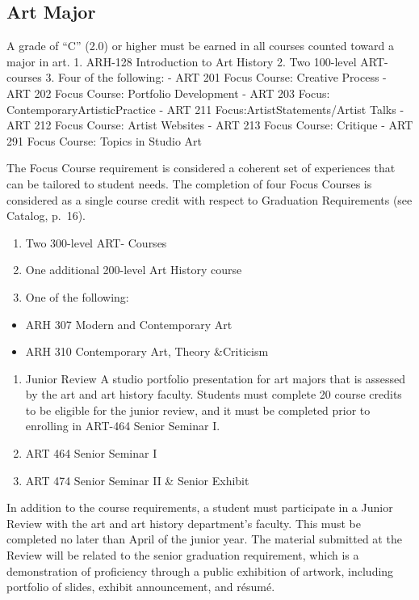 \documentclass[
  letterpaper,
]{scrbook}
\providecommand{\tightlist}{%
  \setlength{\itemsep}{0pt}\setlength{\parskip}{0pt}}
\begin{document}
\hypertarget{art-major}{%
\subsection{Art Major}\label{art-major}}

A grade of ``C'' (2.0) or higher must be earned in all courses counted
toward a major in art. 1. ARH-128 Introduction to Art History 2. Two
100-level ART- courses 3. Four of the following: - ART 201 Focus Course:
Creative Process - ART 202 Focus Course: Portfolio Development - ART 203
Focus: ContemporaryArtisticPractice - ART 211
Focus:ArtistStatements/Artist Talks - ART 212 Focus Course: Artist
Websites - ART 213 Focus Course: Critique - ART 291 Focus Course: Topics
in Studio Art

The Focus Course requirement is considered a coherent set of experiences
that can be tailored to student needs. The completion of four Focus
Courses is considered as a single course credit with respect to
Graduation Requirements (see Catalog, p.~16).

\begin{enumerate}
\def\labelenumi{\arabic{enumi}.}
\setcounter{enumi}{3}
\tightlist
\item
  Two 300-level ART- Courses
\item
  One additional 200-level Art History course
\item
  One of the following:
\end{enumerate}

\begin{itemize}
\tightlist
\item
  ARH 307 Modern and Contemporary Art
\item
  ARH 310 Contemporary Art, Theory \&Criticism
\end{itemize}

\begin{enumerate}
\def\labelenumi{\arabic{enumi}.}
\setcounter{enumi}{6}
\item
  Junior Review A studio portfolio presentation for art majors that is
  assessed by the art and art history faculty. Students must complete 20
  course credits to be eligible for the junior review, and it must be
  completed prior to enrolling in ART-464 Senior Seminar I.
\item
  ART 464 Senior Seminar I
\item
  ART 474 Senior Seminar II \& Senior Exhibit
\end{enumerate}

In addition to the course requirements, a student must participate in a
Junior Review with the art and art history department's faculty. This
must be completed no later than April of the junior year. The material
submitted at the Review will be related to the senior graduation
requirement, which is a demonstration of proficiency through a public
exhibition of artwork, including portfolio of slides, exhibit
announcement, and résumé.
\end{document}
